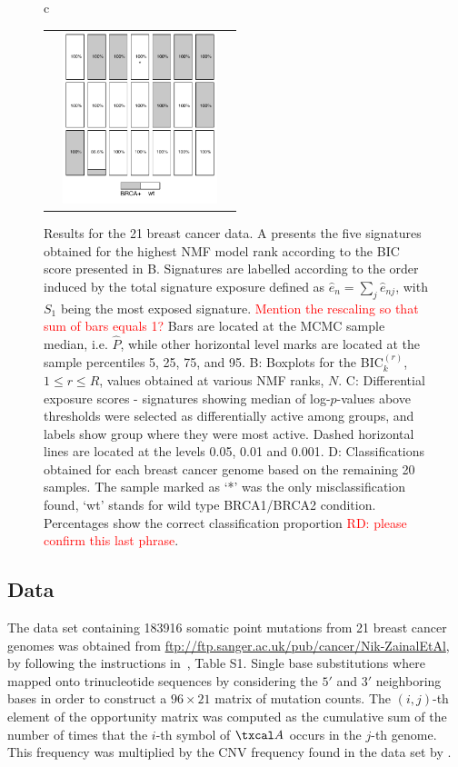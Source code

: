 \documentclass{bioinfo}
\begin{document}
\begin{figure}[htb!]
\begin{tabular}{c}
\begin{tabular}{ccc}
   & 
   \includegraphics[width=4.5cm]{figs/Classific}
 \end{tabular}
 \end{tabular}
 \caption{\textrm{%
    Results for the 21 breast cancer data. A presents the five
    signatures obtained for the highest NMF model rank according to the
    BIC score presented in B. Signatures are labelled according to the
    order induced by the total signature exposure defined as $\hat e_n =
    \sum_{j} \hat e_{nj}$, with $S_1$ being the most exposed
    signature. \textcolor{red}{Mention the rescaling so that sum of bars
    equals 1?}  Bars are located at the MCMC sample median,
    i.e. $\widehat P$, while other horizontal level marks are located
    at the sample percentiles 5, 25, 75, and 95.
    B: Boxplots for the BIC$^{(r)}_k$, $1 \leq r \leq R$, values 
    obtained at various NMF ranks, $N$. C: Differential exposure
    scores - signatures
    showing median of log-$p$-values above thresholds were selected as
    differentially active among groups, and labels show group where they
    were most active.  Dashed horizontal lines are located at 
    the levels 0.05, 0.01 and 0.001. D: Classifications
    obtained for each breast cancer genome based on the remaining 20
    samples. The sample marked as `*' was the only
    misclassification found, `wt' stands for wild type BRCA1/BRCA2
    condition. Percentages show the correct classification proportion
    \textcolor{red}{RD: please confirm this last phrase}. 
  }
 }\label{fig:bcancer} 
\end{figure}
\subsection{Data} The data set containing 183916 somatic point
mutations from 21 breast cancer genomes was obtained from
\url{ftp://ftp.sanger.ac.uk/pub/cancer/Nik-ZainalEtAl}, by
following the instructions in~\cite{NCell}, Table S1. Single base 
substitutions where mapped onto trinucleotide sequences by considering
the $5'$ and $3'$ neighboring bases in order to construct a $96\times
21$ matrix of mutation counts. The $(i,j)$-th element of the
opportunity matrix was computed as the cumulative sum of the number of
times that the $i$-th symbol of $\txcal A$ occurs in the $j$-th
genome. This frequency was multiplied by the CNV frequency
found in the data set by \cite{NCell}.
\end{document}
